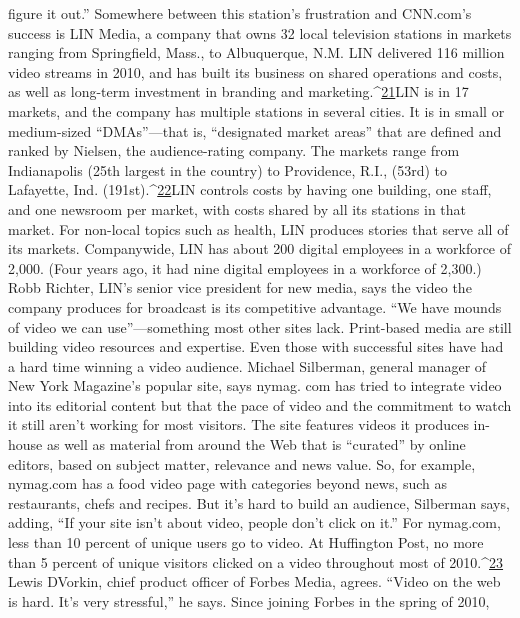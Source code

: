 figure it out.''
Somewhere between this station's frustration and CNN.com's success is LIN
Media, a company that owns 32 local television stations in markets ranging
from Springfield, Mass., to Albuquerque, N.M. LIN delivered 116 million video
streams in 2010, and has built its business on shared operations and costs, as well
as long-term investment in branding and marketing.^{\href{#endnotes-chapter-4}{21}}LIN is in 17 markets, and the company has multiple stations in several cities. It
is in small or medium-sized ``DMAs''—that is, ``designated market areas'' that are
defined and ranked by Nielsen, the audience-rating company. The markets range
from Indianapolis (25th largest in the country) to Providence, R.I., (53rd) to
Lafayette, Ind. (191st).^{\href{#endnotes-chapter-4}{22}}LIN controls costs by having one building, one staff, and
one newsroom per market, with costs shared by all its stations in that market. For
non-local topics such as health, LIN produces stories that serve all of its markets.
Companywide, LIN has about 200 digital employees in a workforce of 2,000.
(Four years ago, it had nine digital employees in a workforce of 2,300.) Robb
Richter, LIN's senior vice president for new media, says the video the company
produces for broadcast is its competitive advantage. ``We have mounds of video
we can use''—something most other sites lack.
Print-based media are still building video resources and expertise. Even those
with successful sites have had a hard time winning a video audience. Michael
Silberman, general manager of New York Magazine's popular site, says nymag.
com has tried to integrate video into its editorial content but that the pace of
video and the commitment to watch it still aren't working for most visitors. The
site features videos it produces in-house as well as material from around the Web
that is ``curated'' by online editors, based on subject matter, relevance and news
value. So, for example, nymag.com has a food video page with categories beyond
news, such as restaurants, chefs and recipes. But it's hard to build an audience,
Silberman says, adding, ``If your site isn't about video, people don't click on it.''
For nymag.com, less than 10 percent of unique users go to video. At Huffington
Post, no more than 5 percent of unique visitors clicked on a video throughout
most of 2010.^{\href{#endnotes-chapter-4}{23}}%
Lewis DVorkin, chief product officer of Forbes Media, agrees. ``Video on the
web is hard. It's very stressful,'' he says. Since joining Forbes in the spring of 2010,
